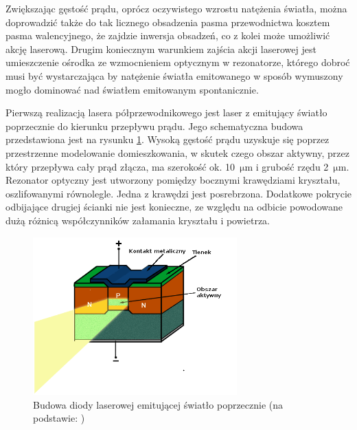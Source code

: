 \documentclass[a4paper,10pt]{article}
\begin{document}
Zwiększając gęstość prądu, oprócz oczywistego wzrostu natężenia światła, można doprowadzić także do tak licznego obsadzenia pasma przewodnictwa kosztem pasma walencyjnego, że zajdzie inwersja obsadzeń, co z kolei może umożliwić akcję laserową. Drugim koniecznym warunkiem zajścia akcji laserowej jest umieszczenie ośrodka ze wzmocnieniem optycznym w rezonatorze, którego dobroć musi być wystarczająca by natężenie światła emitowanego w sposób wymuszony mogło dominować nad światłem emitowanym spontanicznie.

Pierwszą realizacją lasera półprzewodnikowego jest laser z emitujący światło poprzecznie do kierunku przepływu prądu. Jego schematyczna budowa przedstawiona jest na rysunku \ref{rys-eel}. Wysoką gęstość prądu uzyskuje się poprzez przestrzenne modelowanie domieszkowania, w skutek czego obszar aktywny, przez który przepływa cały prąd złącza, ma szerokość ok. 10~$\mathrm{\mu m}$ i grubość rzędu 2~$\mathrm{\mu m}$. Rezonator optyczny jest utworzony pomiędzy bocznymi krawędziami kryształu, oszlifowanymi równolegle. Jedna z krawędzi jest posrebrzona. Dodatkowe pokrycie odbijające drugiej ścianki nie jest konieczne, ze względu na odbicie powodowane dużą różnicą współczynników załamania kryształu i powietrza.

\begin{figure}
\begin{center}
 \includegraphics[width=0.7\textwidth]{./obrazki/rys-eel.png}
\end{center}
\caption{Budowa diody laserowej emitującej światło poprzecznie (na podstawie: \cite{rys-laserki})}
\label{rys-eel}
\end{figure}
\end{document}
